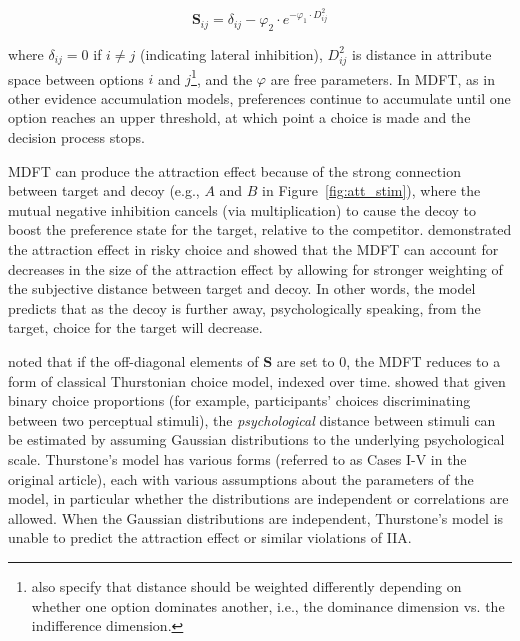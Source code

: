 \begin{equation}
    \boldsymbol{S}_{ij}=\delta_{ij}-\varphi_{2} \cdot e^{-\varphi_{1} \cdot D^2_{ij}}
    \label{eqn:mdft2}
\end{equation}

where $\delta_{ij}=0$ if $i\neq j$ (indicating lateral inhibition), $D^2_{ij}$ is distance in attribute space between options $i$ and $j$\footnote{\textcite{hotalingTheoreticalDevelopmentsDecision2010} also specify that distance should be weighted differently depending on whether one option dominates another, i.e., the dominance dimension vs. the indifference dimension.}, and the $\varphi$ are free parameters. In MDFT, as in other evidence accumulation models, preferences continue to accumulate until one option reaches an upper threshold, at which point a choice is made and the decision process stops.

MDFT can produce the attraction effect because of the strong connection between target and decoy (e.g., $A$ and $B$ in Figure~\ref{fig:att_stim}), where the mutual negative inhibition cancels (via multiplication) to cause the decoy to boost the preference state for the target, relative to the competitor. \textcite{mohr2017attraction} demonstrated the attraction effect in risky choice and showed that the MDFT can account for decreases in the size of the attraction effect by allowing for stronger weighting of the subjective distance between target and decoy. In other words, the model predicts that as the decoy is further away, psychologically speaking, from the target, choice for the target will decrease.

\textcite{roeMultialternativeDecisionField2001a} noted that if the off-diagonal elements of $\boldsymbol{S}$ are set to $0$, the MDFT reduces to a form of classical Thurstonian choice model, indexed over time. \textcite{thurstone1927law} showed that given binary choice proportions (for example, participants' choices discriminating between two perceptual stimuli), the \textit{psychological} distance between stimuli can be estimated by assuming Gaussian distributions to the underlying psychological scale. Thurstone's model has various forms (referred to as Cases I-V in the original article), each with various assumptions about the parameters of the model, in particular whether the distributions are independent or correlations are allowed. When the Gaussian distributions are independent, Thurstone's model is unable to predict the attraction effect or similar violations of IIA. 

